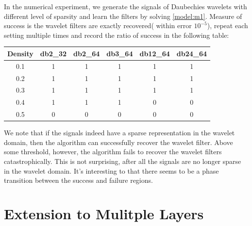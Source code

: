 \documentclass[a4paper]{article}
\begin{document}
In the numerical experiment, we generate the signals of Daubechies wavelets with different level of sparsity and learn the filters by solving \eqref{model:m1}. Measure of success is the wavelet filters are exactly recovered( within error $10^{-5}$), repeat each setting multiple times and record the ratio of success in the following table:
\begin{center}
\begin{tabular}{| c | c | c | c| c | c |}
\hline
Density & db2\_32 & db2\_64 & db3\_64 & db12\_64 & db24\_64 \\
\hline
0.1 & 1 & 1 & 1 & 1 & 1 \\
\hline
0.2 & 1 & 1& 1 & 1 & 1 \\
\hline 
0.3 & 1 & 1 & 1 & 1 & 1  \\
\hline
0.4 & 1 & 1 & 1 & 0 & 0  \\
\hline 
0.5 & 0 & 0 & 0 & 0 & 0 \\
\hline
\end{tabular}
\end{center}
We note that if the signals indeed have a sparse representation in the wavelet domain, then the algorithm can successfully recover the wavelet filter. Above some threshold, however, the algorithm fails to recover the wavelet filters catastrophically. This is not surprising, after all the signals are no longer sparse in the wavelet domain. It's interesting to that there seems to be a phase transition between the success and failure regions.


\section{Extension to Mulitple Layers}
\end{document}

